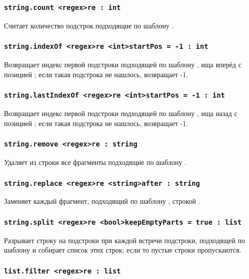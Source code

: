 \documentclass[a4paper, 14pt]{extarticle}
\begin{document}
\subsubsection{\lstinline|string.count <regex>re : int|}

Считает количество подстрок подходящие по шаблону .

\subsubsection{\lstinline|string.indexOf <regex>re <int>startPos = -1 : int|}

Возвращает индекс первой подстроки подходящей по шаблону , ища вперёд с позицией ; если такая подстрока не нашлось, возвращает -1.

\subsubsection{\lstinline|string.lastIndexOf <regex>re <int>startPos = -1 : int|}

Возвращает индекс первой подстроки подходящей по шаблону , ища назад с позицией ; если такая подстрока не нашлось, возвращает -1.

\subsubsection{\lstinline|string.remove <regex>re : string|}

Удаляет из строки все фрагменты подходящие по шаблону .

\subsubsection{\lstinline|string.replace <regex>re <string>after : string|}

Заменяет каждый фрагмент, подходящий по шаблону , строкой .

\subsubsection{\lstinline|string.split <regex>re <bool>keepEmptyParts = true : list|}

Разрывает строку на подстроки при каждой встречи подстроки, подходящей по шаблону  и собирает список этих строк; если  то пустые строки пропускаются.

\subsubsection{\lstinline|list.filter <regex>re : list|}
\end{document}
